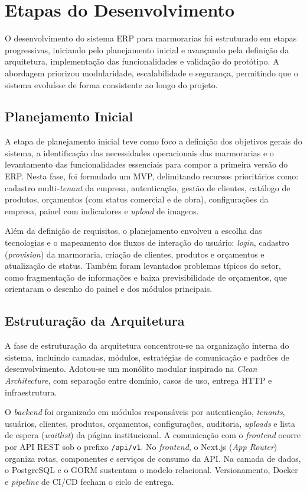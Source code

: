 \section{Etapas do Desenvolvimento}
O desenvolvimento do sistema ERP para marmorarias foi estruturado em etapas progressivas, iniciando pelo planejamento inicial e avançando pela definição da arquitetura, implementação das funcionalidades e validação do protótipo. A abordagem priorizou modularidade, escalabilidade e segurança, permitindo que o sistema evoluísse de forma consistente ao longo do projeto.

\subsection{Planejamento Inicial}
A etapa de planejamento inicial teve como foco a definição dos objetivos gerais do sistema, a identificação das necessidades operacionais das marmorarias e o levantamento das funcionalidades essenciais para compor a primeira versão do ERP. Nesta fase, foi formulado um MVP, delimitando recursos prioritários como: cadastro multi-\textit{tenant} da empresa, autenticação, gestão de clientes, catálogo de produtos, orçamentos (com status comercial e de obra), configurações da empresa, painel com indicadores e \textit{upload} de imagens.

Além da definição de requisitos, o planejamento envolveu a escolha das tecnologias e o mapeamento dos fluxos de interação do usuário: \textit{login}, cadastro (\textit{provision}) da marmoraria, criação de clientes, produtos e orçamentos e atualização de status. Também foram levantados problemas típicos do setor, como fragmentação de informações e baixa previsibilidade de orçamentos, que orientaram o desenho do painel e dos módulos principais.

\subsection{Estruturação da Arquitetura}
A fase de estruturação da arquitetura concentrou-se na organização interna do sistema, incluindo camadas, módulos, estratégias de comunicação e padrões de desenvolvimento. Adotou-se um monólito modular inspirado na \textit{Clean Architecture}, com separação entre domínio, casos de uso, entrega HTTP e infraestrutura.

O \textit{backend} foi organizado em módulos responsáveis por autenticação, \textit{tenants}, usuários, clientes, produtos, orçamentos, configurações, auditoria, \textit{uploads} e lista de espera (\textit{waitlist}) da página institucional. A comunicação com o \textit{frontend} ocorre por API REST sob o prefixo \texttt{/\allowbreak{}api/\allowbreak{}v1}. No \textit{frontend}, o Next.js (\textit{App Router}) organiza rotas, componentes e serviços de consumo da API. Na camada de dados, o PostgreSQL e o GORM sustentam o modelo relacional. Versionamento, Docker e \textit{pipeline} de CI/CD fecham o ciclo de entrega.

